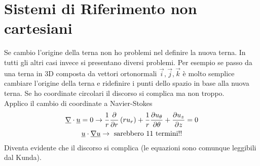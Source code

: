 
\section{Sistemi di Riferimento non cartesiani}
Se cambio l'origine della terna non ho problemi nel definire la nuova terna.
In tutti gli altri casi invece si presentano diversi problemi.
Per esempio se passo da  una terna in 3D composta da vettori ortonormali $ \vec{i},\vec{j},\vec{k} $ è molto semplice cambiare l'origine della terna e ridefinire i punti dello spazio in base alla nuova terna.
Se ho coordinate circolari il discorso si complica ma non troppo.\\
Applico il cambio di coordinate a Navier-Stokes
\begin{gather*}
  \underline{\nabla}\cdot \underline{u} = 0 \rightarrow  \frac{1}{r}\frac{\partial}{\partial r}\left( ru_r \right)  + \frac{1}{r}\frac{\partial u_\theta }{\partial\theta }+\frac{\partial u_z}{\partial z}=0\\
  \underline{u}\cdot \underline{\nabla} \underline{u} \rightarrow \text{ sarebbero 11 termini!!}
\end{gather*}
Diventa evidente che il discorso si complica (le equazioni sono comunque leggibili dal Kunda).\\

